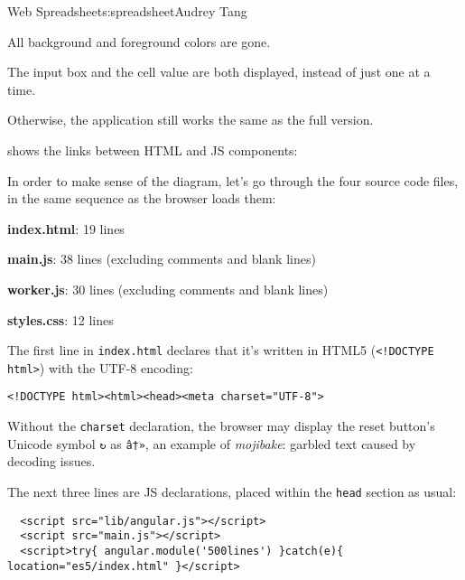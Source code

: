 \begin{aosachapter}{Web Spreadsheet}{s:spreadsheet}{Audrey Tang}
\begin{aosaitemize}

\item
  All background and foreground colors are gone.
\item
  The input box and the cell value are both displayed, instead of just
  one at a time.
\item
  Otherwise, the application still works the same as the full version.
\end{aosaitemize}

\label{code-walkthrough}

 shows the links between HTML
and JS components:


In order to make sense of the diagram, let's go through the four source
code files, in the same sequence as the browser loads them:

\begin{aosaitemize}

\item
  \textbf{index.html}: 19 lines
\item
  \textbf{main.js}: 38 lines (excluding comments and blank lines)
\item
  \textbf{worker.js}: 30 lines (excluding comments and blank lines)
\item
  \textbf{styles.css}: 12 lines
\end{aosaitemize}

\label{html}

The first line in \texttt{index.html} declares that it's written in
HTML5 (\texttt{\textless{}!DOCTYPE html\textgreater{}}) with the UTF-8
encoding:

\begin{verbatim}
<!DOCTYPE html><html><head><meta charset="UTF-8">
\end{verbatim}

Without the \texttt{charset} declaration, the browser may display the
reset button's Unicode symbol \texttt{↻} as \texttt{â†»}, an example of
\emph{mojibake}: garbled text caused by decoding issues.

The next three lines are JS declarations, placed within the
\texttt{head} section as usual:

\begin{verbatim}
  <script src="lib/angular.js"></script>
  <script src="main.js"></script>
  <script>try{ angular.module('500lines') }catch(e){ location="es5/index.html" }</script>
\end{verbatim}


\end{aosachapter}

